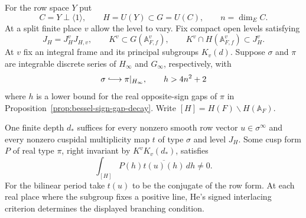 \begin{auxlemma}\label{lem:bottom-unbounded-depth}
For the row space \(Y\) put
\[
 C=Y\perp\langle1\rangle,\qquad H=U(Y)\subset G=U(C),
 \qquad n=\dim_E C.
\]
At a split finite place \(v\) allow the level to vary. Fix compact
open levels satisfying
\[
 J_H=J_H^vJ_{H,v},\qquad K^v\subset G(\mathbb A_{F,f}^v),\qquad
 K^v\cap H(\mathbb A_{F,f}^v)\subset J_H^v .
\]
At \(v\) fix an integral frame and its principal subgroups \(K_v(d)\).
Suppose \(\sigma\) and \(\pi\) are integrable discrete series of
\(H_\infty\) and \(G_\infty\), respectively, with
\[
 \sigma\lhook\joinrel\longrightarrow\pi|_{H_\infty},
 \qquad h>4n^2+2
\]
where \(h\) is a lower bound for the real opposite-sign gaps of \(\pi\)
in Proposition~\ref{prop:bessel-sign-gap-decay}. Write
\([H]=H(F)\backslash H(\mathbb A_F)\).

One finite depth \(d_*\) suffices for every nonzero smooth row vector
\(u\in\sigma^\infty\) and every nonzero cuspidal multiplicity map
\(t\) of type \(\sigma\) and level \(J_H\). Some cusp form \(P\)
of real type \(\pi\), right invariant by \(K^vK_v(d_*)\), satisfies
\[
                 \int_{[H]}P(h)\overline{t(u)(h)}\,dh\ne0 .
\]
For the bilinear period take \(t(u)\) to be the conjugate of the row
form. At each real place where the subgroup fixes a positive line,
He's signed interlacing criterion determines the displayed branching
condition. \cite[Theorem~0.1]{he-discrete-branch}
\end{auxlemma}
